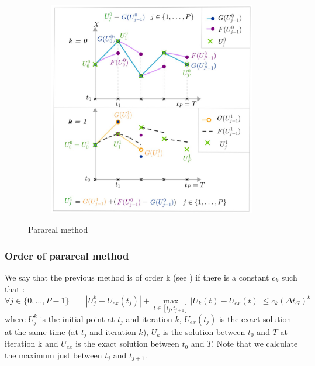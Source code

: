 \begin{figure}[h]
{\begin{minipage}[c]{\linewidth}
\begin{subfigure}[t]{.30\linewidth}
				\label{parareal:5}
			\end{subfigure} 
			\begin{subfigure}[t]{.30\linewidth}      
				\includegraphics[width=\linewidth]{"images/parareal/parareal_6.jpg"}
				\label{parareal:6}
			\end{subfigure}
	\end{minipage}}
	\caption{Parareal method}
	\label{parareal}
\end{figure}

\subsubsection{Order of parareal method}

We say that the previous method is of order k (see \cite{partie2_ref2}) if there is a constant $c_k$ such that :
\begin{equation}
	\forall j\in\{0,\dots,P-1\} \qquad |U_j^k-U_{ex}(t_j)|+\max_{t\in[t_j,t_{j+1}]}|U_k(t)-U_{ex}(t)|\le c_k(\Delta t_G)^k
\end{equation}
where $U_j^k$ is the initial point at $t_j$ and iteration $k$, $U_{ex}(t_j)$ is the exact solution at the same time (at $t_j$ and iteration $k$), $U_k$ is the solution between $t_0$ and $T$ at iteration k and $U_{ex}$ is the exact solution between $t_0$ and $T$. Note that we calculate the maximum just between $t_j$ and $t_{j+1}$. \\

